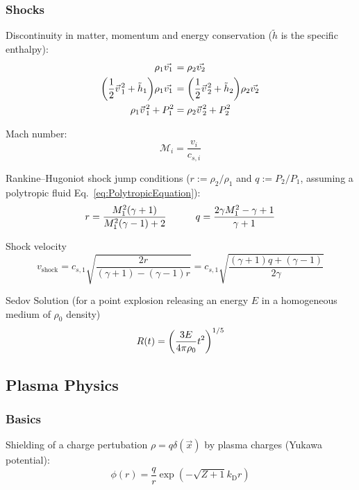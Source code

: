 		\subsubsection{Shocks}
			Discontinuity in matter, momentum and energy conservation ($\tilde{h}$ is the specific enthalpy):
			\begin{align}
				\rho_1 \vec{v_1} &= \rho_2 \vec{v_2} \\
				\qty(\frac{1}{2}\vec{v}_1^2 + \tilde{h}_1) \rho_1 \vec{v_1} &= \qty(\frac{1}{2}\vec{v}_2^2 + \tilde{h}_2) \rho_2 \vec{v_2} \\
				\rho_1 \vec{v}_1^2 + P_1^2 &= \rho_2 \vec{v}_2^2 + P_2^2
			\end{align}

			\noindent
			Mach number:
			\begin{equation}
				\mathcal{M}_i = \frac{v_i}{c_{s,i}}
			\end{equation}

			\noindent
			Rankine--Hugoniot shock jump conditions ($r := \rho_2/\rho_1$ and $q := P_2/P_1$, assuming a polytropic fluid Eq.~\ref{eq:PolytropicEquation}):
			\begin{equation}
				r = \frac{M_1^2(\gamma+1)}{M_1^2(\gamma-1)+2}
				\hspace{30pt}
				q = \frac{2\gamma M_1^2 - \gamma + 1}{\gamma + 1}
			\end{equation}

			\noindent
			Shock velocity
			\begin{equation}
				v_{\text{shock}} = c_{s,1} \sqrt{\frac{2 r}{(\gamma+1) - (\gamma-1)r}} = c_{s,1}\sqrt{\frac{(\gamma+1)q + (\gamma-1)}{2\gamma}}
			\end{equation}

			\noindent
			Sedov Solution (for a point explosion releasing an energy $E$ in a homogeneous medium of $\rho_0$ density)
			\begin{equation}
				R(t) = \qty(\frac{3 E}{4\pi\rho_0}t^2)^{1/5}
			\end{equation}

	\subsection{Plasma Physics}
		\subsubsection{Basics}
			Shielding of a charge pertubation $\rho=q\delta(\vec{x})$ by plasma charges (Yukawa potential):
			\begin{equation}
				\phi(r) = \frac{q}{r} \exp(-\sqrt{Z+1}k_\text{D} r)
			\end{equation}

